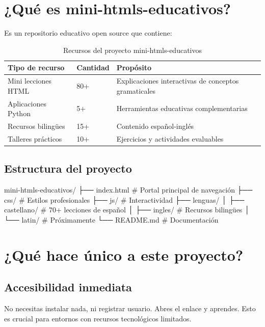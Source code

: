 \documentclass[12pt,spanish]{article}
\begin{document}
\section{¿Qué es mini-htmls-educativos?}

Es un repositorio educativo open source que contiene:

\begin{table}[H]
\centering
\caption{Recursos del proyecto mini-htmls-educativos}
\label{tab:recursos}
\begin{tabular}{|p{5cm}|p{3cm}|p{5cm}|}
\hline
\textbf{Tipo de recurso} & \textbf{Cantidad} & \textbf{Propósito} \\
\hline
Mini lecciones HTML & 80+ & Explicaciones interactivas de conceptos gramaticales \\
\hline
Aplicaciones Python & 5+ & Herramientas educativas complementarias \\
\hline
Recursos bilingües & 15+ & Contenido español-inglés \\
\hline
Talleres prácticos & 10+ & Ejercicios y actividades evaluables \\
\hline
\end{tabular}
\end{table}

\subsection{Estructura del proyecto}

\begin{codigo}
mini-htmls-educativos/
├── index.html              # Portal principal de navegación
├── css/                    # Estilos profesionales
├── js/                     # Interactividad
├── lenguas/
│   ├── castellano/         # 70+ lecciones de español
│   ├── ingles/             # Recursos bilingües
│   └── latin/              # Próximamente
└── README.md               # Documentación
\end{codigo}

\section{¿Qué hace único a este proyecto?}

\subsection{Accesibilidad inmediata}

No necesitas instalar nada, ni registrar usuario. Abres el enlace y aprendes. Esto es crucial para entornos con recursos tecnológicos limitados.
\end{document}
